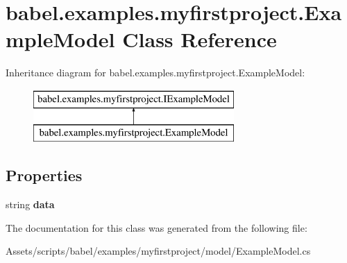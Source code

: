 \hypertarget{classbabel_1_1examples_1_1myfirstproject_1_1_example_model}{\section{babel.\-examples.\-myfirstproject.\-Example\-Model Class Reference}
\label{classbabel_1_1examples_1_1myfirstproject_1_1_example_model}
}
Inheritance diagram for babel.\-examples.\-myfirstproject.\-Example\-Model\-:\begin{figure}[H]
\begin{center}
\leavevmode
\includegraphics[height=2.000000cm]{classbabel_1_1examples_1_1myfirstproject_1_1_example_model}
\end{center}
\end{figure}
\subsection*{Properties}
\begin{DoxyCompactItemize}
\item 
\hypertarget{classbabel_1_1examples_1_1myfirstproject_1_1_example_model_a863e54bf05e702cf7f6deb3403da058e}{string {\bfseries data}}\label{classbabel_1_1examples_1_1myfirstproject_1_1_example_model_a863e54bf05e702cf7f6deb3403da058e}

\end{DoxyCompactItemize}


The documentation for this class was generated from the following file\-:\begin{DoxyCompactItemize}
\item 
Assets/scripts/babel/examples/myfirstproject/model/Example\-Model.\-cs\end{DoxyCompactItemize}
